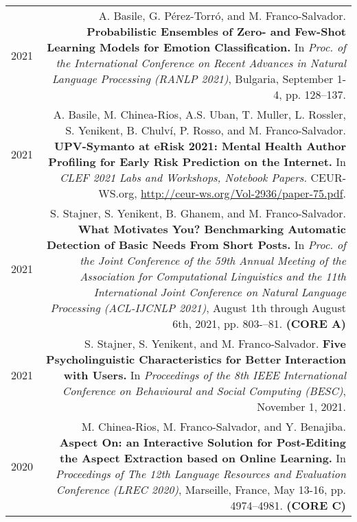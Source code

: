 \documentclass[10pt]{article}
\begin{document}
\begin{tabular}{L!{\VRule}R}
	2021 & A. Basile, G. P{\'e}rez-Torr{\'o}, and M. Franco-Salvador. \textbf{Probabilistic Ensembles of Zero- and Few-Shot Learning Models for Emotion Classification.}
	In \emph{Proc. of the International Conference on Recent Advances in Natural Language Processing (RANLP 2021)}, Bulgaria, September 1-4, pp. 128--137. \vspace{5pt}\\
	2021 & A. Basile, M. Chinea-Rios, A.S. Uban, T. Muller, L. Rossler, S. Yenikent, B. Chulv{\'i}, P. Rosso, and M. Franco-Salvador. \textbf{UPV-Symanto at eRisk 2021: Mental Health Author Profiling for Early Risk Prediction on the Internet.}
	In \emph{CLEF 2021 Labs and Workshops, Notebook Papers.} CEUR-WS.org, \href{http://ceur-ws.org/Vol-2936/paper-75.pdf}{http://ceur-ws.org/Vol-2936/paper-75.pdf}. \vspace{5pt}\\
	2021 & S. Stajner, S. Yenikent, B. Ghanem, and M. Franco-Salvador. \textbf{What Motivates You? Benchmarking Automatic Detection of Basic Needs From Short Posts.}
	In \emph{Proc. of the Joint Conference of the 59th Annual Meeting of the Association for Computational Linguistics and the 11th International Joint Conference on Natural Language Processing (ACL-IJCNLP 2021)}, August 1th through August 6th, 2021, pp.  803-–81. \textbf{(CORE A)}\vspace{5pt}\\
	2021 & S. Stajner, S. Yenikent, and M. Franco-Salvador. \textbf{Five Psycholinguistic Characteristics for Better Interaction with Users.}
	In \emph{Proceedings of the 8th IEEE International Conference on Behavioural and Social Computing (BESC)}, November 1, 2021.\vspace{5pt}\\
	2020 & M. Chinea-Rios, M. Franco-Salvador, and Y. Benajiba. \textbf{Aspect On: an Interactive Solution for Post-Editing the Aspect Extraction based on Online Learning.}
	In \emph{Proceedings of The 12th Language Resources and Evaluation Conference (LREC 2020)}, Marseille, France, May 13-16, pp. 4974--4981. 	\textbf{(CORE C)}\vspace{5pt}\\
\end{tabular}
\end{document}
